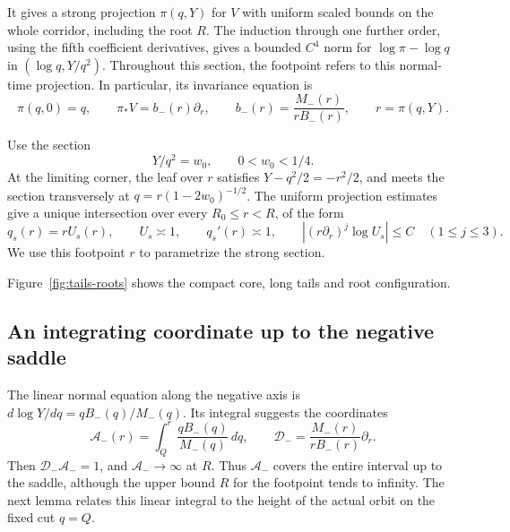 It gives a strong projection \(\pi(q,Y)\) for \(V\) with uniform
scaled bounds
on the whole corridor, including the root \(R\).  The induction
through one further order, using the fifth coefficient derivatives,
gives a bounded \(C^4\) norm for \(\log\pi-\log q\) in
\((\log q,Y/q^2)\).  Throughout this
section, the footpoint refers to this normal-time projection.
In particular, its invariance equation is
\begin{equation}\label{ann:strong-projection}
 \pi(q,0)=q,\qquad \pi_*V=b_-(r)\partial_r,\qquad
 b_-(r)=\frac{M_-(r)}{rB_-(r)},\qquad r=\pi(q,Y).
\end{equation}

Use the section
\begin{equation}\label{ann:negative-strong-section}
 Y/q^2=w_0,\qquad 0<w_0<1/4 .
\end{equation}
At the limiting corner, the leaf over \(r\) satisfies
\(Y-q^2/2=-r^2/2\), and meets the section transversely at
\(q=r(1-2w_0)^{-1/2}\).  The uniform projection estimates give a
unique intersection over every \(R_0\le r<R\), of the form
\[
 q_s(r)=rU_s(r),\qquad U_s\asymp1,\qquad q_s'(r)\asymp1,
 \qquad |(r\partial_r)^j\log U_s|\le C\quad(1\le j\le3).
\]
We use this footpoint \(r\) to parametrize the strong section.

Figure~\ref{fig:tails-roots} shows the compact core, long tails
and root configuration.


\subsection{An integrating coordinate up to the negative saddle}

The linear normal equation along the negative axis is
\(d\log Y/dq=qB_-(q)/M_-(q)\). Its integral suggests the coordinates
\begin{equation}\label{ann:negative-action}
 \mathcal A_-(r)=\int_Q^r\frac{qB_-(q)}{M_-(q)}\,dq,\qquad
 \mathcal D_-=\frac{M_-(r)}{rB_-(r)}\partial_r .
\end{equation}
Then \(\mathcal D_-\mathcal A_-=1\), and
\(\mathcal A_-\to\infty\) at \(R\).
Thus \(\mathcal A_-\) covers the entire interval up to the saddle,
although the upper bound \(R\) for the footpoint tends to infinity.
The next lemma relates this linear integral to the height
of the actual orbit on the fixed cut \(q=Q\).

